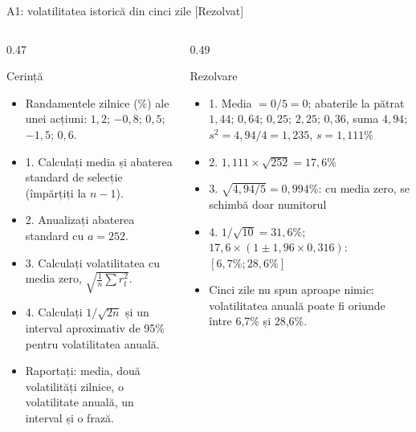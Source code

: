 \begin{frame}{A1: volatilitatea istorică din cinci zile [Rezolvat]}
\itemsize{\scriptsize}
\begin{columns}[T]
\begin{column}{0.47\textwidth}
\begin{block}{Cerință}
\begin{itemize}
    \item Randamentele zilnice (\%) ale unei acțiuni: $1{,}2$; $-0{,}8$; $0{,}5$; $-1{,}5$; $0{,}6$.
    \item 1. Calculați media și abaterea standard de selecție (împărțiți la $n - 1$).
    \item 2. Anualizați abaterea standard cu $a = 252$.
    \item 3. Calculați volatilitatea cu media zero, $\sqrt{\frac{1}{n}\sum r_t^2}$.
    \item 4. Calculați $1/\sqrt{2n}$ și un interval aproximativ de 95\% pentru volatilitatea anuală.
    \item Raportați: media, două volatilități zilnice, o volatilitate anuală, un interval și o frază.
\end{itemize}
\end{block}
\end{column}
\begin{column}{0.49\textwidth}
\begin{exampleblock}{Rezolvare}
\begin{itemize}
    \item 1. Media $= 0/5 = 0$; abaterile la pătrat $1{,}44$; $0{,}64$; $0{,}25$; $2{,}25$; $0{,}36$, suma $4{,}94$; $s^2 = 4{,}94/4 = 1{,}235$, $s = 1{,}111\%$
    \item 2. $1{,}111 \times \sqrt{252} = 17{,}6\%$
    \item 3. $\sqrt{4{,}94/5} = 0{,}994\%$: cu media zero, se schimbă doar numitorul
    \item 4. $1/\sqrt{10} = 31{,}6\%$; $17{,}6 \times (1 \pm 1{,}96 \times 0{,}316)$: $[6{,}7\%; 28{,}6\%]$
    \item Cinci zile nu spun aproape nimic: volatilitatea anuală poate fi oriunde între 6{,}7\% și 28{,}6\%.
\end{itemize}
\end{exampleblock}
\end{column}
\end{columns}
\end{frame}

